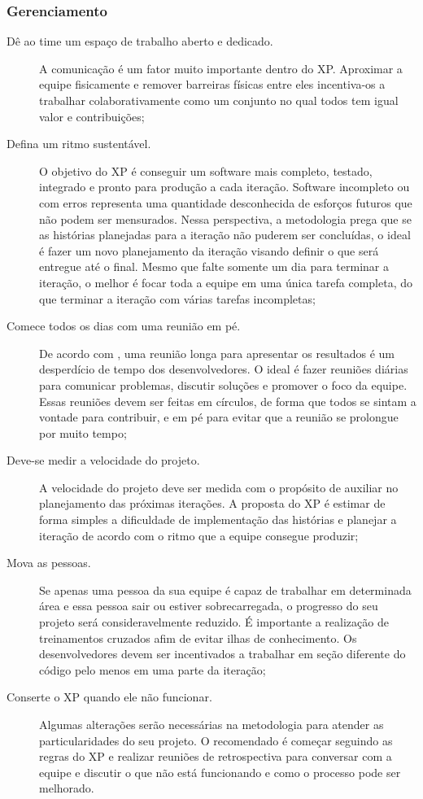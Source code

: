 \subsubsection{Gerenciamento}
\begin{description}
    \item[Dê ao time um espaço de trabalho aberto e dedicado.] A comunicação é um
    fator muito importante dentro do \acrlong{XP}. Aproximar a equipe fisicamente e
    remover barreiras físicas entre eles incentiva-os a trabalhar colaborativamente
    como um conjunto no qual todos tem igual valor e contribuições;
    \item[Defina um ritmo sustentável.] O objetivo do \gls{XP} é conseguir um software
    mais completo, testado, integrado e pronto para produção a cada iteração. Software
    incompleto ou com erros representa uma quantidade desconhecida de esforços futuros
    que não podem ser mensurados. Nessa perspectiva, a metodologia prega que se as
    histórias planejadas para a iteração não puderem ser concluídas, o ideal é fazer
    um novo planejamento da iteração visando definir o que será entregue até o final.
    Mesmo que falte somente um dia para terminar a iteração, o melhor é focar toda a
    equipe em uma única tarefa completa, do que terminar a iteração com várias tarefas
    incompletas;
    \item[Comece todos os dias com uma reunião em pé.] De acordo com ,
    uma reunião longa para apresentar os resultados é um desperdício de tempo dos
    desenvolvedores. O ideal é fazer reuniões diárias para comunicar problemas, discutir
    soluções e promover o foco da equipe. Essas reuniões devem ser feitas em círculos, de
    forma que todos se sintam a vontade para contribuir, e em pé para evitar que a reunião
    se prolongue por muito tempo;
    \item[Deve-se medir a velocidade do projeto.] A velocidade do projeto deve ser
    medida com o propósito de auxiliar no planejamento das próximas iterações. A proposta
    do \gls{XP} é estimar de forma simples a dificuldade de implementação das histórias
    e planejar a iteração de acordo com o ritmo que a equipe consegue produzir;
    \item[Mova as pessoas.] Se apenas uma pessoa da sua equipe é capaz de trabalhar
    em determinada área e essa pessoa sair ou estiver sobrecarregada, o progresso do seu
    projeto será consideravelmente reduzido. É importante a realização de treinamentos
    cruzados afim de evitar ilhas de conhecimento. Os desenvolvedores devem ser
    incentivados a trabalhar em seção diferente do código pelo menos em uma parte da
    iteração;
    \item[Conserte o \gls{XP} quando ele não funcionar.] Algumas alterações serão
    necessárias na metodologia para atender as particularidades do seu projeto. O
    recomendado é começar seguindo as regras do \gls{XP} e realizar reuniões de
    retrospectiva para conversar com a equipe e discutir o que não está funcionando
    e como o processo pode ser melhorado.
\end{description}

